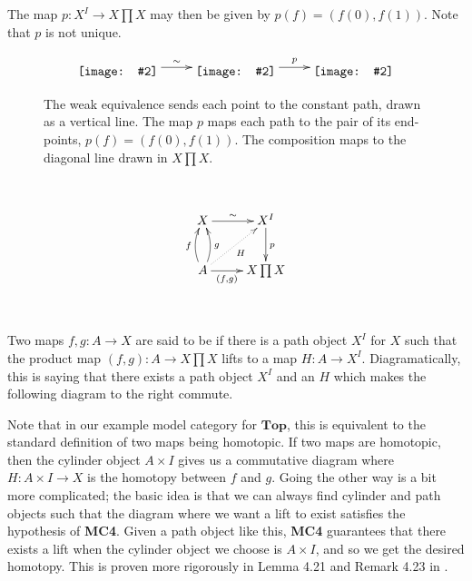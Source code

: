 \documentclass{amsart}
\theoremstyle{definition} \newaliasedtheorem{defn}[thm]{Definition}
\theoremstyle{definition} \newtheorem*{defn*}{Definition}
\theoremstyle{definition} \newaliasedtheorem{xca}[thm]{Exercise}
\theoremstyle{definition} \newtheorem*{soln*}{Solution}
\theoremstyle{definition} \newaliasedtheorem{remark}[thm]{Remark}
\theoremstyle{definition} \newtheorem*{remark*}{Remark}
\newcommand{\defnlabel}[2][]{%
  \ifempty{#1}{%
    \label{defn:#2}\emph{#2}%
  }{%
    \label{defn:#1}\emph{#2}%
  }%
}
\newcommand{\xyincludegraphics}[2][]{\raisebox{-0.5\height}{\texttt{[image: \#2]}}}
\newcommand{\cat}[1]{\ensuremath{\mathbf{#1}}}
\begin{document}
\begin{example}
      The map $p : X^I \to X\prod X$ may then be given by $p(f) = (f(0), f(1))$.  Note that $p$ is not unique.
      
      \begin{figure}[htb]
        \[
        \xymatrix{
          \xyincludegraphics[width=6em]{path_object-X} \ar[r]^-{\sim} & \xyincludegraphics[width=8em]{path_object-X^I} \ar[r]^-p & \xyincludegraphics[width=6em]{path_object-X_x_X}
        }
        \]
        \caption[Path Object Diagram]{The weak equivalence sends each point to the constant path, drawn as a vertical line.  The map $p$ maps each path to the pair of its end-points, $p(f) = (f(0), f(1))$.  %
          The composition maps to the diagonal line drawn in $X \prod X$.} \label{fig:path-object-diagram}
      \end{figure}
    \end{example}
      
      

    $\left.\right.$
    \begin{figure}
      $$
        \xymatrix{
          X \ar[r]^-{\sim} & X^I \ar[d]^p \\
          A \ar@/^/[u]^f \ar@/_/[u]_g \ar[r]_-{(f, g)} \ar@{.>}[ur]_H & X \prod X
        }
      $$
    \end{figure}
    $\left.\right.$

    \begin{defn}
      Two maps $f, g : A \to X$ are said to be \defnlabel{right homotopic} if there is a path object $X^I$ for $X$ such that the product map $(f, g) : A \to X \prod X$ lifts to a map $H : A \to X^I$.  Diagramatically, this is saying that there exists a path object $X^I$ and an $H$ which makes the following diagram to the right commute.
    \end{defn}
    
    Note that in our example model category for \cat{Top}, this is equivalent to the standard definition of two maps being homotopic.  If two maps are homotopic, then the cylinder object $A \times I$ gives us a commutative diagram where $H : A \times I \to X$ is the homotopy between $f$ and $g$.  Going the other way is a bit more complicated; the basic idea is that we can always find cylinder and path objects such that the diagram where we want a lift to exist satisfies the hypothesis of \textbf{MC4}.  Given a path object like this, \textbf{MC4} guarantees that there exists a lift when the cylinder object we choose is $A \times I$, and so we get the desired homotopy.  This is proven more rigorously in Lemma 4.21 and Remark 4.23 in \cite{dwyer1995homotopy}.
\end{document}
